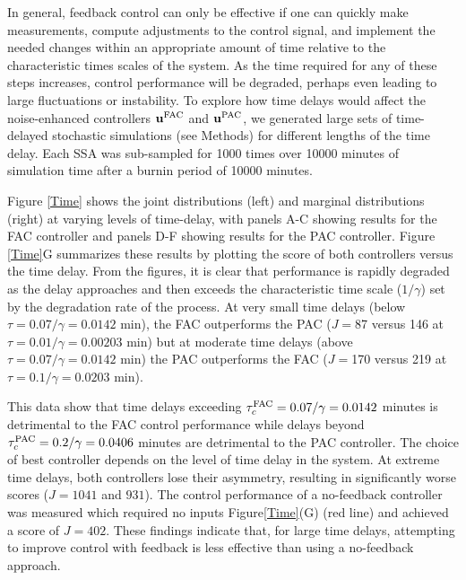 \documentclass[12pt]{iopart}
\begin{document}
In general, feedback control can only be effective if one can quickly make measurements, compute adjustments to the control signal, and implement the needed changes within an appropriate amount of time relative to the characteristic times scales of the system. As the time required for any of these steps increases, control performance will be degraded, perhaps even leading to large fluctuations or instability. To explore how time delays would affect the noise-enhanced controllers $\mathbf{u}^{\rm FAC}$ and $\mathbf{u}^{\rm PAC}$, we generated large sets of time-delayed stochastic simulations (see Methods) for different lengths of the time delay. Each SSA was sub-sampled for 1000 times over 10000 minutes of simulation time after a burnin period of 10000 minutes.

Figure \ref{Time} shows the joint distributions (left) and marginal distributions (right) at varying levels of time-delay, with panels A-C showing results for the FAC controller and panels D-F showing results for the PAC controller. Figure \ref{Time}G summarizes these results by plotting the score of both controllers versus the time delay. From the figures, it is clear that performance is rapidly degraded as the delay approaches and then exceeds the characteristic time scale ($1/\gamma$) set by the degradation rate of the process. At very small time delays (below $\tau = 0.07/\gamma = 0.0142$ min), the FAC outperforms the PAC ($J=$87 versus 146 at $\tau = 0.01/\gamma = 0.00203$ min) but at moderate time delays (above $\tau = 0.07/\gamma = 0.0142$ min) the PAC outperforms the FAC ($J=$170 versus 219 at $\tau = 0.1/\gamma = 0.0203$ min). 

\brian[Are these times correct?  Isn't gamma = 0.0203 in Table 1?  tau = 0.07 / 0.0203 (1/min) = 3.44 min. Please check this carefully.]

\michael[minutes]

This data show that time delays exceeding $\tau_c^{\rm FAC} = 0.07 / \gamma = 0.0142$ minutes is detrimental to the FAC control performance while delays beyond $\tau_c^{\rm PAC} = 0.2 / \gamma = 0.0406$ minutes are detrimental to the PAC controller.  The choice of best controller depends on the level of time delay in the system. At extreme time delays, both controllers lose their asymmetry, resulting in significantly worse scores ($J = 1041$ and $931$). The control performance of a no-feedback controller was measured which required no inputs Figure\ref{Time}(G) (red line) and achieved a score of $J = 402$. These findings indicate that, for large time delays, attempting to improve control with feedback is less effective than using a no-feedback approach.
\end{document}
